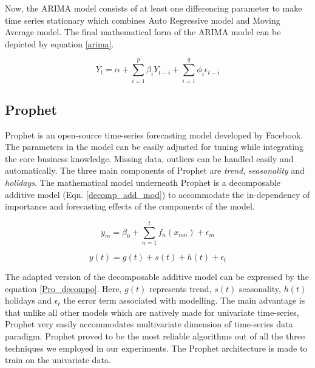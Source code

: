 \documentclass[10pt,journal,compsoc]{IEEEtran}
\begin{document}
Now, the ARIMA model consists of at least one differencing parameter to make time series stationary which combines Auto Regressive model and Moving Average model. The final mathematical form of the ARIMA model can be depicted by equation \ref{arima}. 

\begin{equation}
	\label{arima}
	Y_t = \alpha + \sum_{i = 1}^{p}\beta_i Y_{t-i} + \sum_{i = 1}^{q}\phi_i \epsilon_{t-i}
\end{equation}



\subsection{Prophet}
Prophet is an open-source time-series forecasting model developed by Facebook. The parameters in the model can be easily adjusted for tuning while integrating the core business knowledge. Missing data, outliers can be handled easily and automatically. The three main components of Prophet are \emph{trend}, \emph{seasonality} and \emph{holidays}. The mathematical model underneath Prophet is a decomposable additive model (Eqn. \ref{decomp_add_mod}) to accommodate the in-dependency of importance and forecasting effects of the components of the model.

\begin{equation}
	\label{decomp_add_mod}
	y_m = \beta_0 + \sum_{n = 1}^{t}f_n(x_{mn}) + \epsilon_m
\end{equation}    

\begin{equation}
	\label{Pro_decompo}
	y(t) = g(t) + s(t) + h(t) + \epsilon_t
\end{equation}

The adapted version of the decomposable additive model can be expressed by the equation \ref{Pro_decompo}. Here, \(g(t)\) represents trend, \(s(t)\) seasonality,  \(h(t)\) holidays and \(\epsilon_t\) the error term associated with modelling. The main advantage is that unlike all other models which are natively made for univariate time-series, Prophet very easily accommodates multivariate dimension of time-series data paradigm. Prophet proved to be the most reliable algorithms out of all the three techniques we employed in our experiments. The Prophet architecture is made to train on the univariate data.
\end{document}
